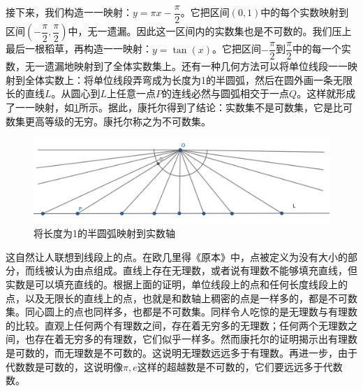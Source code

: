 \documentclass[b5paper]{ctexart}
\begin{document}
接下来，我们构造一一映射：$y = \pi x - \dfrac{\pi}{2}$。它把区间$(0, 1)$中的每个实数映射到区间$(-\dfrac{\pi}{2}, \dfrac{\pi}{2})$中，无一遗漏。因此这一区间内的实数集也是不可数的。我们压上最后一根稻草，再构造一一映射：$y = \tan(x)$。它把区间$-\dfrac{\pi}{2}$到$\dfrac{\pi}{2}$中的每一个实数，无一遗漏地映射到了全体实数集上。还有一种几何方法可以将单位线段一一映射到全体实数上：将单位线段弄弯成为长度为1的半圆弧，然后在圆外画一条无限长的直线$L$。从圆心到$L$上任意一点$P$的连线必然与圆弧相交于一点$Q$。这样就形成了一一映射，如\cref{fig:seg-to-line}所示。据此，康托尔得到了结论：实数集不是可数集，它是比可数集更高等级的无穷。康托尔称之为不可数集。

\begin{figure}[htbp]
 \centering
 \includegraphics[scale=0.6]{img/seg-to-line}
 \caption{将长度为1的半圆弧映射到实数轴}
 \label{fig:seg-to-line}
\end{figure}

这自然让人联想到线段上的点。在欧几里得《原本》中，点被定义为没有大小的部分，而线被认为由点组成。直线上存在无理数，或者说有理数不能够填充直线，但实数是可以填充直线的。根据上面的证明，单位线段上的点和任何长度线段上的点，以及无限长的直线上的点，也就是和数轴上稠密的点是一样多的，都是不可数集。同心圆上的点也同样多，也都是不可数集。同样令人吃惊的是无理数与有理数的比较。直观上任何两个有理数之间，存在着无穷多的无理数；任何两个无理数之间，也存在着无穷多的有理数，它们似乎一样多。然而康托尔的证明揭示出有理数是可数的，而无理数是不可数的。这说明无理数远远多于有理数。再进一步，由于代数数是可数的，这说明像$\pi, e$这样的超越数是不可数的，它们要远远多于代数数。
\end{document}
